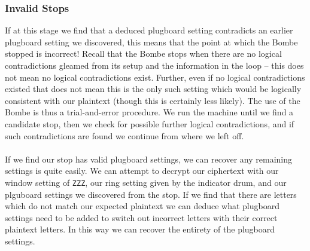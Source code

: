 \subsubsection{Invalid Stops}
If at this stage we find that a deduced plugboard setting contradicts an earlier plugboard setting we discovered, this means that the point at which the Bombe stopped is incorrect! Recall that the Bombe stops when there are no logical contradictions gleamed from its setup and the information in the loop -- this does not mean no logical contradictions exist. Further, even if no logical contradictions existed that does not mean this is the only such setting which would be logically consistent with our plaintext (though this is certainly less likely). The use of the Bombe is thus a trial-and-error procedure. We run the machine until we find a candidate stop, then we check for possible further logical contradictions, and if such contradictions are found we continue from where we left off.
\\\\If we find our stop has valid plugboard settings, we can recover any remaining settings is quite easily. We can attempt to decrypt our ciphertext with our window setting of \texttt{ZZZ}, our ring setting given by the indicator drum, and our plguboard settings we discovered from the stop. If we find that there are letters which do not match our expected plaintext we can deduce what plugboard settings need to be added to switch out incorrect letters with their correct plaintext letters. In this way we can recover the entirety of the plugboard settings.
